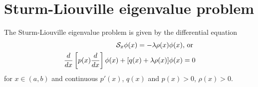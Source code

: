 \section{Sturm-Liouville eigenvalue problem}

The Sturm-Liouville eigenvalue problem is given by the differential equation
\begin{equation}
\begin{split}
{\cal S}_{x}    \phi (x) = -\lambda \rho  (x) \phi (x)\textrm{, or } \\
\frac{d}{dx}
\left[
p(x)
\frac{d}{dx}
\right] \phi(x)
+
[q(x)  +   \lambda \rho  (x) ]\phi(x)=0
\end{split}
\label{2011-m-ch-slee}
\end{equation}
for $x\in(a,b)$ and continuous  $p'(x)$, $q(x)$ and $p(x)>0$, $\rho  (x)>0$.

